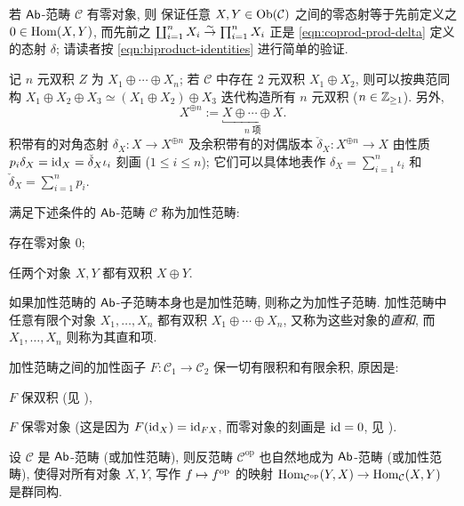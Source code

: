 若 $\mathsf{Ab}$-范畴 $\mathcal{C}$ 有零对象, 则 \cite[引理 3.4.11]{Li1} 保证任意 $X, Y \in \operatorname{Ob}(\mathcal{C})$ 之间的零态射等于先前定义之 $0 \in \operatorname{Hom}(X, Y)$, 而先前之 $\coprod_{i=1}^n X_i \stackrel{\sim}{\rightarrow} \prod_{i=1}^n X_i$ 正是 \eqref{eqn:coprod-prod-delta} 定义的态射 $\delta$; 请读者按 \eqref{eqn:biproduct-identities} 进行简单的验证. 

\begin{convention}\label{con:biproduct}
	记 $n$ 元双积 $Z$ 为 $X_1 \oplus \cdots \oplus X_n$; 若 $\mathcal{C}$ 中存在 $2$ 元双积 $X_1 \oplus X_2$, 则可以按典范同构 $X_1 \oplus X_2 \oplus X_3 \simeq (X_1 \oplus X_2) \oplus X_3$ 迭代构造所有 $n$ 元双积 ($n \in \mathbb{Z}_{\geq 1}$). 另外,
	\[ X^{\oplus n} := \underbracket{X \oplus \cdots \oplus X}_{n\; \text{项}}. \]
	积带有的对角态射 $\delta_X: X \to X^{\oplus n}$ 及余积带有的对偶版本 $\check{\delta}_X: X^{\oplus n} \to X$ 由性质 $p_i \delta_X = \mathrm{id}_X = \check{\delta}_X \iota_i$ 刻画 ($1 \leq i \leq n$); 它们可以具体地表作 $\delta_X = \sum_{i=1}^n \iota_i$ 和 $\check{\delta}_X = \sum_{i=1}^n p_i$.
\end{convention}

\begin{definition}[加性范畴]\label{def:additive-category}
	满足下述条件的 $\mathsf{Ab}$-范畴 $\mathcal{C}$ 称为加性范畴:
	\begin{compactitem}
		\item 存在零对象 $0$;
		\item 任两个对象 $X, Y$ 都有双积 $X \oplus Y$.
	\end{compactitem}
	如果加性范畴的 $\mathsf{Ab}$-子范畴本身也是加性范畴, 则称之为加性子范畴. 加性范畴中任意有限个对象 $X_1, \ldots, X_n$ 都有双积 $X_1 \oplus \cdots \oplus X_n$, 又称为这些对象的\emph{直和}, 而 $X_1, \ldots, X_n$ 则称为其直和项.
\end{definition}

加性范畴之间的加性函子 $F: \mathcal{C}_1 \to \mathcal{C}_2$ 保一切有限积和有限余积, 原因是:
\begin{compactitem}
	\item $F$ 保双积 (见 \cite[命题 3.4.13]{Li1}),
	\item $F$ 保零对象 (这是因为 $F(\mathrm{id}_X) = \mathrm{id}_{FX}$, 而零对象的刻画是 $\mathrm{id} = 0$, 见 \cite[引理 3.4.11]{Li1}).
\end{compactitem}

设 $\mathcal{C}$ 是 $\mathsf{Ab}$-范畴 (或加性范畴), 则反范畴 $\mathcal{C}^{\text{op}}$ 也自然地成为 $\mathsf{Ab}$-范畴 (或加性范畴), 使得对所有对象 $X, Y$, 写作 $f \mapsto f^{\operatorname{op}}$ 的映射 $\operatorname{Hom}_{\mathcal{C}^{\operatorname{op}}}(Y, X) \to \operatorname{Hom}_{\mathcal{C}}(X, Y)$ 是群同构.

